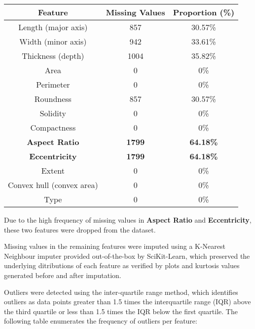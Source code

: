 \begin{table}[h]
    \label{table_feature_values}
    \begin{center}
    \begin{tabular}{|c||c|c|}
    \hline
    \textbf{Feature} & \textbf{Missing Values} & \textbf{Proportion (\%)} \\
    \hline
    Length (major axis) & 857 & 30.57\% \\
    \hline
    Width (minor axis) & 942 & 33.61\% \\
    \hline
    Thickness (depth) & 1004 & 35.82\% \\
    \hline
    Area & 0 & 0\% \\
    \hline
    Perimeter & 0 & 0\% \\
    \hline
    Roundness & 857 & 30.57\% \\
    \hline
    Solidity & 0 & 0\% \\
    \hline
    Compactness & 0 & 0\% \\
    \hline
    \textbf{Aspect Ratio} & \textbf{1799} & \textbf{64.18\%} \\
    \hline
    \textbf{Eccentricity} & \textbf{1799} & \textbf{64.18\%} \\
    \hline
    Extent & 0 & 0\% \\
    \hline
    Convex hull (convex area) & 0 & 0\% \\
    \hline
    Type & 0 & 0\% \\
    \hline
    \end{tabular}
    \end{center}
    \end{table} \vspace{-0.5em}

Due to the high frequency of missing values in \textbf{Aspect Ratio} and
\textbf{Eccentricity}, these two features were dropped from the dataset.

Missing values in the remaining features were imputed using a K-Nearest Neighbour imputer
provided out-of-the-box by SciKit-Learn, which preserved the underlying ditributions of each feature as verified by plots and kurtosis
values generated before and after imputation.

Outliers were detected using the inter-quartile range method, which identifies outliers as data points 
greater than 1.5 times the interquartile range (IQR) above the third quartile or less 
than 1.5 times the IQR below the first quartile. The following table enumerates the frequency
of outliers per feature:

